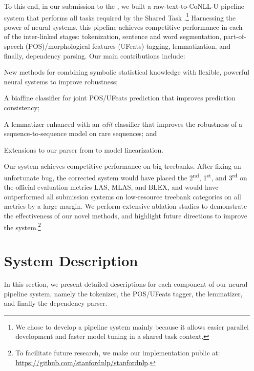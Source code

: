 \documentclass[11pt,a4paper]{article}
\newcommand{\conllu}{CoNLL-U}
\begin{document}
To this end, in our submission to the \udst{}, we built a  raw-text-to-\conllu{} pipeline system that performs all tasks required by the Shared Task \cite{udst:overview}.\footnote{We chose to develop a pipeline system mainly because it allows easier parallel development and faster model tuning in a shared task context.}
Harnessing the power of neural systems, this pipeline achieves competitive performance in each of the inter-linked stages: tokenization, sentence and word segmentation, part-of-speech (POS)/morphological features (UFeats) tagging, lemmatization, and finally, dependency parsing.
Our main contributions include:
\begin{compactitem}
    \item New methods for combining symbolic statistical knowledge with flexible, powerful neural systems to improve robustness;
    \item A biaffine classifier for joint POS/UFeats prediction that improves prediction consistency;
    \item A lemmatizer enhanced with an \emph{edit} classifier that improves the robustness of a sequence-to-sequence model on rare sequences; and
    \item Extensions to our parser from \cite{dozat-qi-manning:2017:K17-3} to model linearization.
\end{compactitem}

Our system achieves competitive performance on big treebanks. After fixing an unfortunate bug, the corrected system would have placed the 2\textsuperscript{nd}, 1\textsuperscript{st}, and 3\textsuperscript{rd} on the official evaluation metrics LAS, MLAS, and BLEX,
and would have outperformed all submission systems on low-resource treebank categories on all metrics by a large margin.
We perform extensive ablation studies to demonstrate the effectiveness of our novel methods, and highlight future directions to improve the system.\footnote{To facilitate future research, we make our implementation public at: \url{https://github.com/stanfordnlp/stanfordnlp}.}

%
 
\section{System Description}

In this section, we present detailed descriptions for each component of our neural pipeline system, namely the tokenizer, the POS/UFeats tagger, the lemmatizer, and finally the dependency parser.
\end{document}
